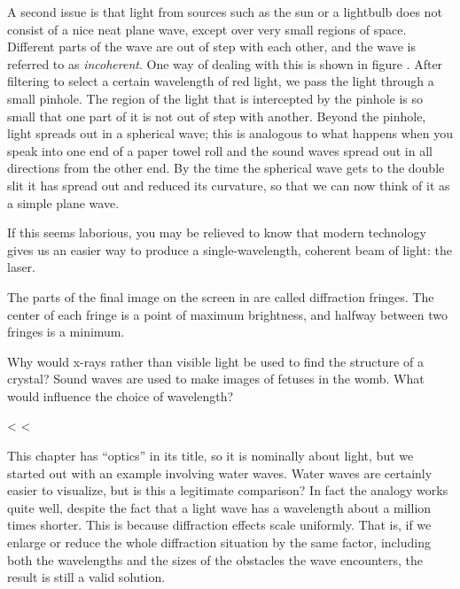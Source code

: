 A second issue is that light from sources such as the sun or
a lightbulb does not consist of a nice neat plane wave,
except over very small regions of space. Different parts of
the wave are out of step with each other, and the wave is
referred to as \emph{incoherent}. One way
of dealing with this is shown in figure . After filtering
to select a certain wavelength of red light, we pass the
light through a small pinhole. The region of the light that
is intercepted by the pinhole is so small that one part of
it is not out of step with another. Beyond the pinhole,
light spreads out in a spherical wave; this is analogous to
what happens when you speak into one end of a paper towel
roll and the sound waves spread out in all directions from
the other end. By the time the spherical wave gets to the
double slit it has spread out and reduced its curvature, so
that we can now think of it as a simple plane wave.

If this seems laborious, you may be relieved to know that
modern technology gives us an easier way to produce a
single-wavelength, coherent beam of light: the laser.

The parts of the final image on the screen in  are called
diffraction fringes.
The center of each fringe is a point of maximum brightness,
and halfway between two fringes is a minimum.

\startdq

\begin{dq}
Why would x-rays rather than visible light be used to find
the structure of a crystal? Sound waves are used to make
images of fetuses in the womb. What would influence the
choice of wavelength?
\end{dq}

<%
<%

This chapter has ``optics'' in its title, so it is nominally
about light, but we started out with an example involving
water waves. Water waves are certainly easier to visualize,
but is this a legitimate comparison? In fact the analogy
works quite well, despite the fact that a light wave has a
wavelength about a million times shorter. This is because
diffraction effects scale uniformly. That is, if we enlarge
or reduce the whole diffraction situation by the same
factor, including both the wavelengths and the sizes of the
obstacles the wave encounters, the result is still a valid solution.

